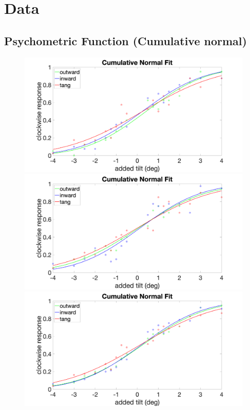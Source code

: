 \documentclass[11pt]{article} %
\begin{document}
\newpage
\section{Data}
\subsection{Psychometric Function (Cumulative normal)}
\begin{figure}[H]
\centering %
\includegraphics[scale=.08]{Images/PF_set1.png}
\includegraphics[scale=.08]{Images/PF_set2.png}
\includegraphics[scale=.08]{Images/PF_combined.png}

\end{figure}
\end{document}
